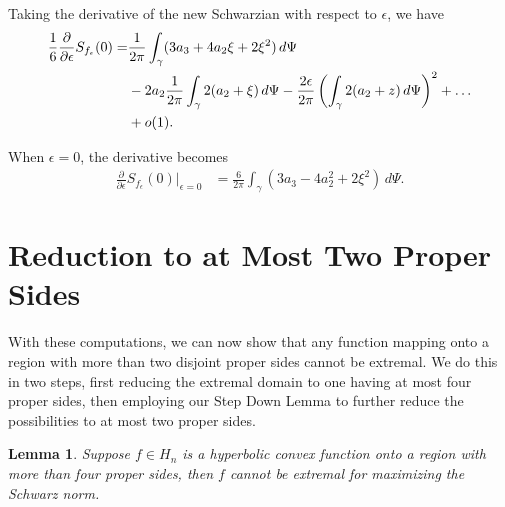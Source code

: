 \documentclass{lms}
\newcommand{\e}{\epsilon}
\newcommand{\iG}{\int_{\gamma}}
\newtheorem{lemma}[theorem]{Lemma}
\numberwithin{equation}{section}
\begin{document}
Taking the derivative of the new Schwarzian  with respect to $\epsilon$, we have
\begin{align}\notag
\frac{1}{6}\frac{\partial}{\partial \e} S_{f_\epsilon}(0) = 
&\frac 1{2\pi}\iG (3a_3 + 4a_2\xi + 2\xi^2) \, d\Psi  \\ \notag
 &- 2 a_2\frac{1}{2\pi}
\iG 2(a_2+\xi) \, d\Psi - \frac{2\e}{2\pi}\left(\iG 2(a_2 + z) \, 
d\Psi\right)^2  +\dots \\\notag
& +o(1).
\end{align}

When $\e=0$, the derivative becomes
\begin{align}\label{E:Sg}
\frac{\partial}{\partial \e} S_{f_\epsilon}(0) \bigg\vert_{\e=0} 
&=\frac{6}{2\pi}\iG (3a_3-4a_2^2 + 2\xi^2) \, d\Psi.
\end{align}




\section{Reduction to at Most Two Proper Sides}\label{S:2sides}
With these computations, we can now show that any function mapping onto 
a region with
more than two disjoint proper sides cannot be extremal.  We do this in two 
steps, first reducing the extremal domain to one having at
 most four proper sides, then employing our
Step Down Lemma to further reduce the possibilities to 
at most two proper sides.


\begin{lemma}\label{L:4sides}
Suppose $f \in H_n$ is a hyperbolic convex function onto a region with
more than four proper sides, then $f$ cannot be extremal for maximizing
the Schwarz norm.
\end{lemma}
\end{document}
